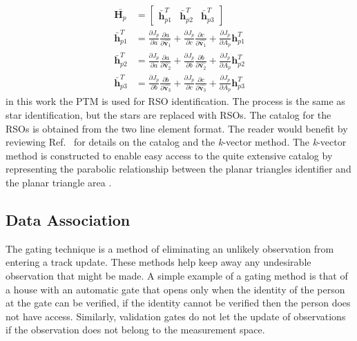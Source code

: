 \documentclass[]{aiaa-tc}%
\begin{document}
\begin{subequations}
\begin{align}
\bar{\textbf{H}_p} &= 
\begin{bmatrix}
\bar{\textbf{h}}^T_{p1} & \bar{\textbf{h}}^T_{p2}& \bar{\textbf{h}}^T_{p3}
\end{bmatrix}\\
\bar{\textbf{h}}^T_{p1} &= \frac{\partial J_p}{\partial a} \frac{\partial a}{\partial{\hat{\textbf{v}_1}}} + \frac{\partial J_p}{\partial c} \frac{\partial c}{\partial {\hat{\textbf{v}_1}}} + \frac{\partial J_p}{\partial A_p}  \textbf{h}^T_{p1}\\
\bar{\textbf{h}}^T_{p2} &= \frac{\partial J_p}{\partial a} \frac{\partial a}{\partial{\hat{\textbf{v}_2}}} + \frac{\partial J_p}{\partial b} \frac{\partial b}{\partial {\hat{\textbf{v}_2}}} + \frac{\partial J_p}{\partial A_p}  \textbf{h}^T_{p2}\\
\bar{\textbf{h}}^T_{p3} &= \frac{\partial J_p}{\partial b} \frac{\partial b}{\partial{\hat{\textbf{v}_3}}} + \frac{\partial J_p}{\partial c} \frac{\partial c}{\partial {\hat{\textbf{v}_3}}} + \frac{\partial J_p}{\partial A_p}  \textbf{h}^T_{p3}
\end{align}
\end{subequations}
in this work the PTM is used for RSO identification. The process is the same as star identification, but the stars are replaced with RSOs. The catalog for the RSOs is obtained from the two line element format. The reader would benefit by reviewing Ref.~ for details on the catalog  and the \textit{k}-vector method. The \textit{k}-vector method is constructed to enable easy access to the quite extensive catalog by representing the parabolic relationship between the planar triangles identifier and the planar triangle area \cite{cole_fast_2006,PTM}.\\

\subsection{Data Association}
The gating technique is a method of eliminating an unlikely observation from entering a track update. These methods help keep away any  undesirable observation that might be made. A simple example of a gating method is that of a house with an automatic gate that opens only when the identity of the person at the gate can be verified, if the identity cannot be verified then the person does not have access. Similarly, validation gates do not let the update of observations if the observation does not belong to the measurement space.\\
\end{document}
